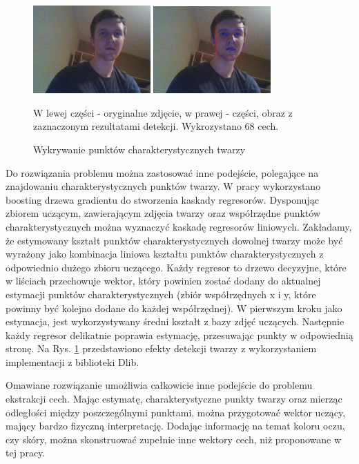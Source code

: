 \documentclass[oneside, eng]{mgr}
\begin{document}
\begin{figure}
\centering
	\includegraphics[width=0.40\textwidth,natwidth=310,natheight=642]{img/test.jpg}
	\includegraphics[width=0.40\textwidth,natwidth=310,natheight=642]{img/test_result.jpg}
\caption{Wykrywanie punktów charakterystycznych twarzy}
W lewej części - oryginalne zdjęcie, w prawej - części, obraz z zaznaczonym rezultatami detekcji. Wykrozystano 68 cech.
	\label{fig:face_landmark_detect}
\end{figure}

Do rozwiązania problemu można zastosować inne podejście, polegające na znajdowaniu charakterystycznych punktów twarzy. W pracy \cite{Landmark face detector} wykorzystano boosting drzewa gradientu do stworzenia kaskady regresorów. Dysponując zbiorem uczącym, zawierającym zdjęcia twarzy oraz współrzędne punktów charakterystycznych można wyznaczyć kaskadę regresorów liniowych. Zakładamy, że estymowany kształt punktów charakterystycznych dowolnej twarzy może być wyrażony jako kombinacja liniowa kształtu punktów charakterystycznych z odpowiednio dużego zbioru uczącego. Każdy regresor to drzewo decyzyjne, które w liściach przechowuje wektor, który powinien zostać dodany do aktualnej estymacji punktów charakterystycznych (zbiór współrzędnych x i y, które powinny być kolejno dodane do każdej współrzędnej). W pierwszym kroku jako estymacja, jest wykorzystywany średni kształt z bazy zdjęć uczących. Następnie każdy regresor delikatnie poprawia estymację, przesuwając punkty w odpowiednią stronę. Na Rys. \ref{fig:face_landmark_detect} przedstawiono efekty detekcji twarzy z wykorzystaniem implementacji z biblioteki Dlib.

Omawiane rozwiązanie umożliwia całkowicie inne podejście do problemu ekstrakcji cech. Mając estymatę, charakterystyczne punkty twarzy oraz mierząc odległości między poszczególnymi punktami, można przygotować wektor uczący, mający bardzo fizyczną interpretację. Dodając informację na temat koloru oczu, czy skóry, można skonstruować zupełnie inne wektory cech, niż proponowane w tej pracy. 
\end{document}
